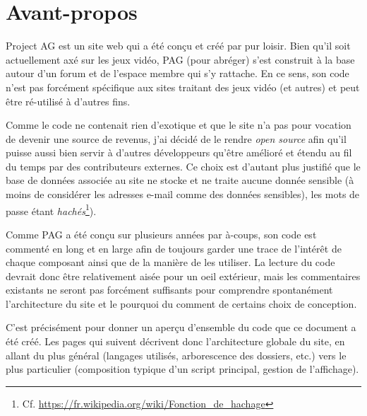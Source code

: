 \chapter*{Avant-propos}
\setcounter{chapter}{0}

Project AG est un site web qui a été conçu et créé par pur loisir. Bien qu'il soit actuellement 
axé sur les jeux vidéo, PAG (pour abréger) s'est construit à la base autour d'un forum et de 
l'espace membre qui s'y rattache. En ce sens, son code n'est pas forcément spécifique aux sites 
traitant des jeux vidéo (et autres) et peut être ré-utilisé à d'autres fins.

Comme le code ne contenait rien d'exotique et que le site n'a pas pour vocation de devenir une 
source de revenus, j'ai décidé de le rendre \textit{open source} afin qu'il puisse aussi bien 
servir à d'autres développeurs qu'être amélioré et étendu au fil du temps par des contributeurs 
externes. Ce choix est d'autant plus justifié que le base de données associée au site ne stocke 
et ne traite aucune donnée sensible (à moins de considérer les adresses e-mail comme des données 
sensibles), les mots de passe étant \textit{hachés}\footnote{Cf. 
\url{https://fr.wikipedia.org/wiki/Fonction_de_hachage}}).

Comme PAG a été conçu sur plusieurs années par à-coups, son code est commenté en long et en large 
afin de toujours garder une trace de l'intérêt de chaque composant ainsi que de la manière de 
les utiliser. La lecture du code devrait donc être relativement aisée pour un oeil extérieur, mais 
les commentaires existants ne seront pas forcément suffisants pour comprendre spontanément 
l'architecture du site et le pourquoi du comment de certains choix de conception.

C'est précisément pour donner un aperçu d'ensemble du code que ce document a été créé. Les pages 
qui suivent décrivent donc l'architecture globale du site, en allant du plus général (langages 
utilisés, arborescence des dossiers, etc.) vers le plus particulier (composition typique d'un 
script principal, gestion de l'affichage).
